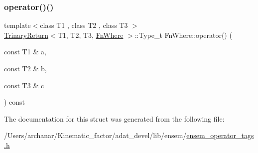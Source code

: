 \mbox{\label{structFnWhere_ad37f5c32c5ad4b8288a595841b16e178}} 
\subsubsection{\texorpdfstring{operator()()}{operator()()}\hspace{0.1cm}{\footnotesize\ttfamily [2/2]}}
{\footnotesize\ttfamily template$<$class T1 , class T2 , class T3 $>$ \\
\mbox{\hyperlink{structTrinaryReturn}{Trinary\+Return}}$<$T1, T2, T3, \mbox{\hyperlink{structFnWhere}{Fn\+Where}} $>$\+::Type\+\_\+t Fn\+Where\+::operator() (\begin{DoxyParamCaption}\item[{const T1 \&}]{a,  }\item[{const T2 \&}]{b,  }\item[{const T3 \&}]{c }\end{DoxyParamCaption}) const\hspace{0.3cm}{\ttfamily [inline]}}



The documentation for this struct was generated from the following file\+:\begin{DoxyCompactItemize}
\item 
/\+Users/archanar/\+Kinematic\+\_\+factor/adat\+\_\+devel/lib/ensem/\mbox{\hyperlink{lib_2ensem_2ensem__operator__tags_8h}{ensem\+\_\+operator\+\_\+tags.\+h}}\end{DoxyCompactItemize}
